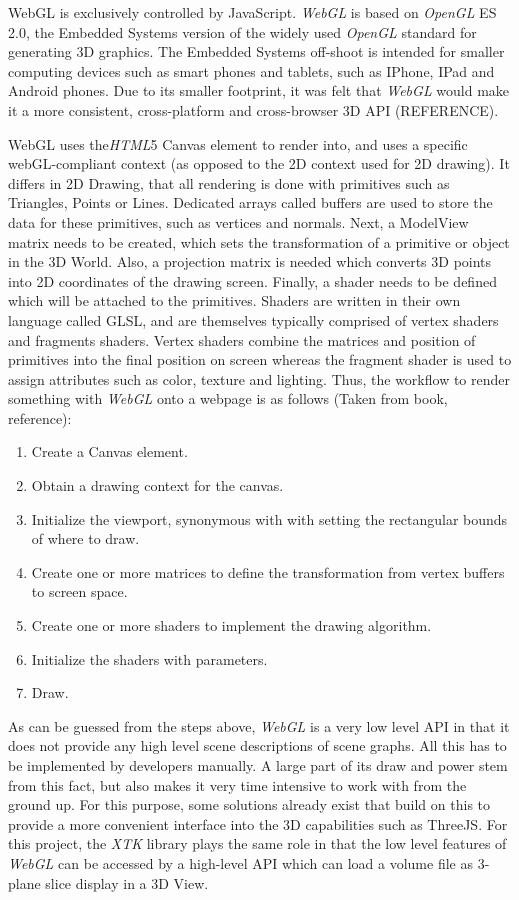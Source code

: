 \documentclass[a4paper,11pt,twoside]{article}
\begin{document}
WebGL is exclusively controlled by JavaScript. \textit{WebGL} is based on \textit{OpenGL} ES 2.0, the Embedded Systems version of the widely used \textit{OpenGL} standard for generating 3D graphics. The Embedded Systems off-shoot is intended for smaller computing devices such as smart phones and tablets, such as IPhone, IPad and Android phones. Due to its smaller footprint, it was felt that \textit{WebGL} would make it a more consistent, cross-platform and cross-browser 3D API (REFERENCE). 

WebGL uses the\textit{HTML}5 Canvas element to render into, and uses a specific webGL-compliant context (as opposed to the 2D context used for 2D drawing). It differs in 2D Drawing, that all rendering is done with primitives such as Triangles, Points or Lines. 
Dedicated arrays called buffers are used to store the data for these primitives, such as vertices and normals. Next, a ModelView matrix needs to be created, which sets the transformation of a primitive or object in the 3D World. Also, a projection matrix is needed which converts 3D points into 2D coordinates of the drawing screen. Finally, a shader needs to be defined which will be attached to the primitives. Shaders are written in their own language called GLSL, and are themselves typically comprised of vertex shaders and fragments shaders. Vertex shaders combine the matrices and position of primitives into the final position on screen whereas the fragment shader is used to assign attributes such as color, texture and lighting. Thus, the workflow to render something with \textit{WebGL} onto a webpage is as follows (Taken from book, reference):

\begin{enumerate}
\item Create a Canvas element.
\item Obtain a drawing context for the canvas.
\item Initialize the viewport, synonymous with with setting the rectangular bounds of where to draw.
\item Create one or more matrices to define the transformation from vertex buffers to screen space.
\item Create one or more shaders to implement the drawing algorithm.
\item Initialize the shaders with parameters.
\item Draw.
\end{enumerate}


As can be guessed from the steps above, \textit{WebGL} is a very low level API in that it does not provide any high level scene descriptions of scene graphs. All this has to be implemented by developers manually. A large part of its draw and power stem from this fact, but also makes it very time intensive to work with from the ground up. For this purpose, some solutions already exist that build on this to provide a more convenient interface into the 3D capabilities such as ThreeJS. For this project, the \textit{XTK} library plays the same role in that the low level features of \textit{WebGL} can be accessed by a high-level API which can load a volume file as 3-plane slice display in a 3D View.
\end{document}
